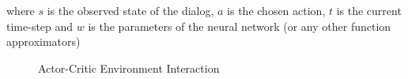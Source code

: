 \documentclass[14pt]{extarticle}
\numberwithin{equation}{section}
\begin{document}
	where $s$ is the observed state of the dialog, $a$ is the chosen action, $t$ is the current time-step and $w$ is the parameters of the neural network (or any other function approximators) 
	\begin{figure}[h]
		\centering
		\setlength{\fboxsep}{5pt}%
		\setlength{\fboxrule}{1pt}%
		\caption{Actor-Critic Environment Interaction
		\label{a2c}}
	\end{figure}
\end{document}
